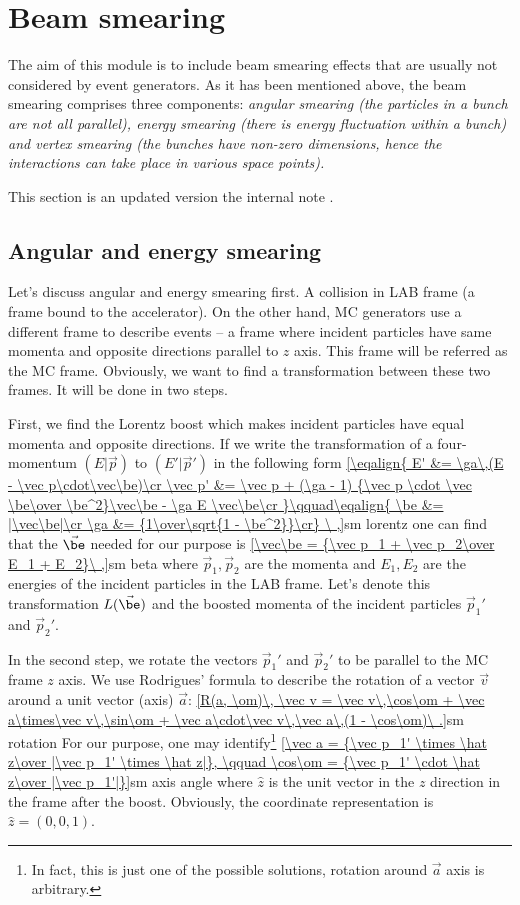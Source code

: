 \section[beam smearing]{Beam smearing}

The aim of this module is to include beam smearing effects that are usually not considered by event generators. As it has been mentioned above, the beam smearing comprises three components: \em{angular smearing} (the particles in a bunch are not all parallel), \em{energy smearing} (there is energy fluctuation within a bunch) and \em{vertex smearing} (the bunches have non-zero dimensions, hence the interactions can take place in various space points).

This section is an updated version the internal note .


\subsection{Angular and energy smearing}

Let's discuss angular and energy smearing first. A collision in LAB frame (a frame bound to the accelerator). On the other hand, MC generators use a different frame to describe events -- a frame where incident particles have same momenta and opposite directions parallel to $z$ axis. This frame will be referred as the MC frame. Obviously, we want to find a transformation between these two frames. It will be done in two steps. 

First, we find the Lorentz boost which makes incident particles have equal momenta and opposite directions. If we write the transformation of a four-momentum $(E|\vec p)$ to $(E'|\vec p')$ in the following form
\eqref{\eqalign{
E'      &= \ga\,(E - \vec p\cdot\vec\be)\cr
\vec p' &= \vec p  +  (\ga - 1) {\vec p \cdot \vec \be\over \be^2}\vec\be - \ga E \vec\be\cr
}\qquad\eqalign{
\be &= |\vec\be|\cr
\ga &= {1\over\sqrt{1 - \be^2}}\cr}
\ ,}{sm lorentz}
one can find that the $\vec\be$ needed for our purpose is
\eqref{\vec\be = {\vec p_1 + \vec p_2\over E_1 + E_2}\ ,}{sm beta}
where $\vec p_1, \vec p_2$ are the momenta and $E_1, E_2$ are the energies of the incident particles in the LAB frame. Let's denote this transformation $L(\vec\be)$ and the boosted momenta of the incident particles $\vec p_1'$ and $\vec p_2'$.

In the second step, we rotate the vectors $\vec p_1'$ and $\vec p_2'$ to be parallel to the MC frame $z$ axis. We use Rodrigues' formula to describe the rotation of a vector $\vec v$ around a unit vector (axis) $\vec a$:
\eqref{R(a, \om)\, \vec v = \vec v\,\cos\om + \vec a\times\vec v\,\sin\om + \vec a\cdot\vec v\,\vec a\,(1 - \cos\om)\ .}{sm rotation}
For our purpose, one may identify\footnote{In fact, this is just one of the possible solutions, rotation around $\vec a$ axis is arbitrary.}
\eqref{\vec a = {\vec p_1' \times \hat z\over |\vec p_1' \times \hat z|}, \qquad \cos\om = {\vec p_1' \cdot \hat z\over |\vec p_1'|}}{sm axis angle}
where $\hat z$ is the unit vector in the $z$ direction in the frame after the boost. Obviously, the coordinate representation is $\hat z = (0, 0, 1)$.

